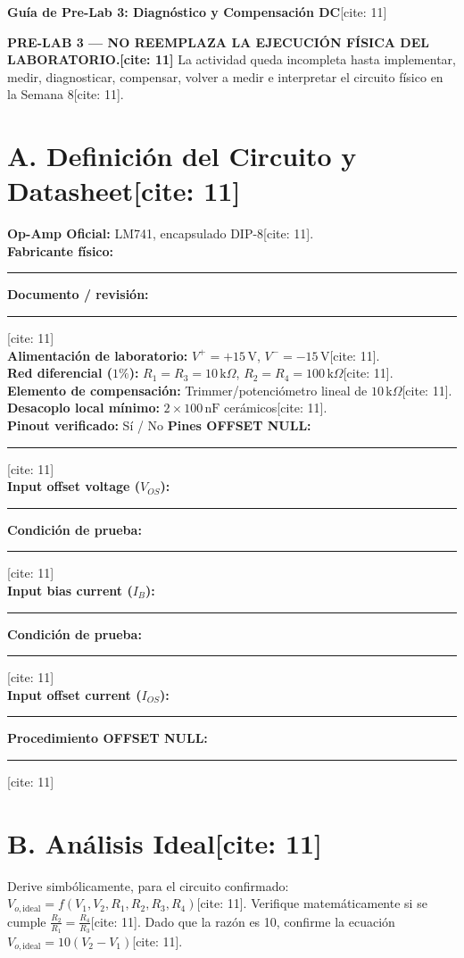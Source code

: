 \documentclass[11pt, a4paper]{article}
\begin{document}
\begin{center}
    \Large\textbf{\textcolor{ucbblue}{Guía de Pre-Lab 3: Diagnóstico y Compensación DC}}[cite: 11]
\end{center}

\begin{tcolorbox}[colback=red!5, colframe=red!70!black, title=\textbf{ADVERTENCIA IMPORTANTE}]
    \textbf{PRE-LAB 3 — NO REEMPLAZA LA EJECUCIÓN FÍSICA DEL LABORATORIO.[cite: 11]} La actividad queda incompleta hasta implementar, medir, diagnosticar, compensar, volver a medir e interpretar el circuito físico en la Semana 8[cite: 11].
\end{tcolorbox}

\section*{A. Definición del Circuito y Datasheet[cite: 11]}
\textbf{Op-Amp Oficial:} LM741, encapsulado DIP-8[cite: 11]. \\
\textbf{Fabricante físico:} \rule{4cm}{0.4pt} \textbf{Documento / revisión:} \rule{4cm}{0.4pt}[cite: 11] \\
\textbf{Alimentación de laboratorio:} $V^+ = +15\,\text{V}$, $V^- = -15\,\text{V}$[cite: 11]. \\
\textbf{Red diferencial ($1\%$):} $R_1=R_3=10\,\text{k}\Omega$, $R_2=R_4=100\,\text{k}\Omega$[cite: 11]. \\
\textbf{Elemento de compensación:} Trimmer/potenciómetro lineal de $10\,\text{k}\Omega$[cite: 11]. \\
\textbf{Desacoplo local mínimo:} $2 \times 100\,\text{nF}$ cerámicos[cite: 11]. \\
\textbf{Pinout verificado:} Sí / No \hfill \textbf{Pines OFFSET NULL:} \rule{4cm}{0.4pt}[cite: 11] \\
\textbf{Input offset voltage ($V_{OS}$):} \rule{3cm}{0.4pt} \textbf{Condición de prueba:} \rule{3cm}{0.4pt}[cite: 11] \\
\textbf{Input bias current ($I_B$):} \rule{3cm}{0.4pt} \textbf{Condición de prueba:} \rule{3cm}{0.4pt}[cite: 11] \\
\textbf{Input offset current ($I_{OS}$):} \rule{3cm}{0.4pt} \textbf{Procedimiento OFFSET NULL:} \rule{3cm}{0.4pt}[cite: 11]

\section*{B. Análisis Ideal[cite: 11]}
Derive simbólicamente, para el circuito confirmado: $V_{o,\mathrm{ideal}} = f(V_1, V_2, R_1, R_2, R_3, R_4)$[cite: 11].
Verifique matemáticamente si se cumple $\frac{R_2}{R_1} = \frac{R_4}{R_3}$[cite: 11]. Dado que la razón es 10, confirme la ecuación $V_{o,\mathrm{ideal}} = 10(V_2 - V_1)$[cite: 11].
\end{document}
